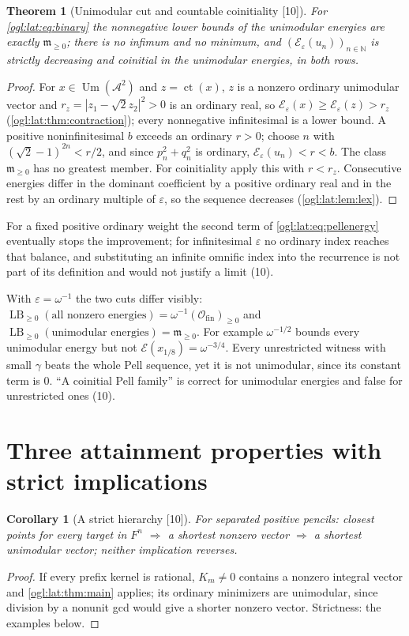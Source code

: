 \documentclass[11pt,oneside]{article}
\numberwithin{equation}{section}
\newtheorem{theorem}{Theorem}[section]
\newtheorem{corollary}[corollary]{Corollary}
\theoremstyle{definition}
\theoremstyle{remark}
\newcommand{\N}{\mathbb N}
\newcommand{\A}{\mathcal A}
\newcommand{\cE}{\mathcal E}
\newcommand{\Ofin}{\mathcal O_{\mathrm{fin}}}
\newcommand{\mm}{\mathfrak m}
\newcommand{\ct}{\operatorname{ct}}
\newcommand{\Um}{\operatorname{Um}}
\newcommand{\LB}{\operatorname{LB}_{\ge0}}
\newcommand{\src}[1]{\textup{\textsf{\small[#1]}}}
\begin{document}
\begin{theorem}[Unimodular cut and countable coinitiality \src{10}]\label{ogl:lat:thm:pellcut}
For \eqref{ogl:lat:eq:binary} the nonnegative lower bounds of the unimodular
energies are exactly $\mm_{\ge0}$; there is no infimum and no minimum, and
$(\cE_\varepsilon(u_n))_{n\in\N}$ is strictly decreasing and coinitial in the
unimodular energies, in both rows.
\end{theorem}
\begin{proof}
For $x\in\Um(\A^2)$ and $z=\ct(x)$, $z$ is a nonzero ordinary unimodular vector and
$r_z=|z_1-\sqrt2z_2|^2>0$ is an ordinary real, so
$\cE_\varepsilon(x)\ge\cE_\varepsilon(z)>r_z$ (\cref{ogl:lat:thm:contraction}); every
nonnegative infinitesimal is a lower bound. A positive noninfinitesimal $b$
exceeds an ordinary $r>0$; choose $n$ with $(\sqrt2-1)^{2n}<r/2$, and since
$p_n^2+q_n^2$ is ordinary, $\cE_\varepsilon(u_n)<r<b$. The class $\mm_{\ge0}$ has no
greatest member. For coinitiality apply this with $r<r_z$. Consecutive energies
differ in the dominant coefficient by a positive ordinary real and in the rest by
an ordinary multiple of $\varepsilon$, so the sequence decreases
(\cref{ogl:lat:lem:lex}).
\end{proof}

For a fixed positive ordinary weight the second term of
\eqref{ogl:lat:eq:pellenergy} eventually stops the improvement; for infinitesimal
$\varepsilon$ no ordinary index reaches that balance, and substituting an
infinite omnific index into the recurrence is not part of its definition and
would not justify a limit (10).

With $\varepsilon=\omega^{-1}$ the two cuts differ visibly:
$\LB(\text{all nonzero energies})=\omega^{-1}(\Ofin)_{\ge0}$ and
$\LB(\text{unimodular energies})=\mm_{\ge0}$. For example $\omega^{-1/2}$ bounds
every unimodular energy but not $\cE(x_{1/8})=\omega^{-3/4}$. Every unrestricted
witness with small $\gamma$ beats the whole Pell sequence, yet it is not
unimodular, since its constant term is $0$. ``A coinitial Pell family'' is
correct for unimodular energies and false for unrestricted ones (10).

\section{Three attainment properties with strict implications}\label{ogl:lat:sec:examples}

\begin{corollary}[A strict hierarchy \src{10}]\label{ogl:lat:cor:hierarchy}
For separated positive pencils: closest points for every target in $F^n$
$\Rightarrow$ a shortest nonzero vector $\Rightarrow$ a shortest unimodular
vector; neither implication reverses.
\end{corollary}
\begin{proof}
If every prefix kernel is rational, $K_m\ne0$ contains a nonzero integral vector
and \cref{ogl:lat:thm:main} applies; its ordinary minimizers are unimodular,
since division by a nonunit gcd would give a shorter nonzero vector. Strictness:
the examples below.
\end{proof}
\end{document}

